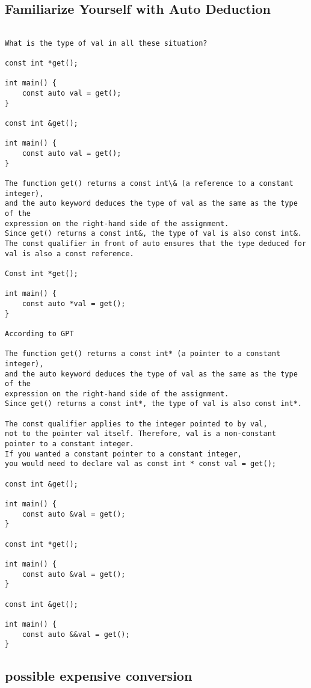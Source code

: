 \documentclass[openany]{report}
\begin{document}
\subsection{Familiarize Yourself with Auto Deduction}

\begin{verbatim}

What is the type of val in all these situation?

const int *get();

int main() {
    const auto val = get();
}

const int &get();

int main() {
    const auto val = get();
}

The function get() returns a const int\& (a reference to a constant integer),
and the auto keyword deduces the type of val as the same as the type of the
expression on the right-hand side of the assignment.
Since get() returns a const int&, the type of val is also const int&.
The const qualifier in front of auto ensures that the type deduced for
val is also a const reference.

Const int *get();

int main() {
    const auto *val = get();
}

According to GPT

The function get() returns a const int* (a pointer to a constant integer),
and the auto keyword deduces the type of val as the same as the type of the
expression on the right-hand side of the assignment.
Since get() returns a const int*, the type of val is also const int*.

The const qualifier applies to the integer pointed to by val,
not to the pointer val itself. Therefore, val is a non-constant pointer to a constant integer.
If you wanted a constant pointer to a constant integer,
you would need to declare val as const int * const val = get();

const int &get();

int main() {
    const auto &val = get();
}

const int *get();

int main() {
    const auto &val = get();
}

const int &get();

int main() {
    const auto &&val = get();
}
\end{verbatim}

\subsection{possible expensive conversion}
\end{document}
